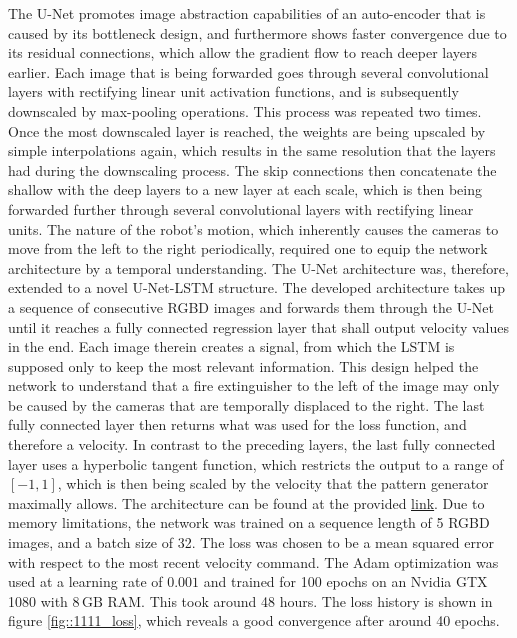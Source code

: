 The U-Net promotes image abstraction capabilities of an auto-encoder that is caused by its bottleneck design, and furthermore shows faster convergence due to its residual connections, which allow the gradient flow to reach deeper layers earlier. Each image that is being forwarded goes through several convolutional layers with rectifying linear unit activation functions, and is subsequently downscaled by max-pooling operations. This process was repeated two times. Once the most downscaled layer is reached, the weights are being upscaled by simple interpolations again, which results in the same resolution that the layers had during the downscaling process. The skip connections then concatenate the shallow with the deep layers to a new layer at each scale, which is then being forwarded further through several convolutional layers with rectifying linear units. The nature of the robot's motion, which inherently causes the cameras to move from the left to the right periodically, required one to equip the network architecture by a temporal understanding. The U-Net architecture was, therefore, extended to a novel U-Net-LSTM structure. The developed architecture takes up a sequence of consecutive RGBD images and forwards them through the U-Net until it reaches a fully connected regression layer that shall output velocity values in the end. Each image therein creates a signal, from which the LSTM is supposed only to keep the most relevant information. This design helped the network to understand that a fire extinguisher to the left of the image may only be caused by the cameras that are temporally displaced to the right. The last fully connected layer then returns what was used for the loss function, and therefore a velocity. In contrast to the preceding layers, the last fully connected layer uses a hyperbolic tangent function, which restricts the output to a range of $[-1,1]$, which is then being scaled by the velocity that the pattern generator maximally allows. The architecture can be found at the provided \href{https://github.com/mhubii/nmpc_pattern_generator/blob/master/libs/learning/python/unet_model.py}{\underline{link}}. Due to memory limitations, the network was trained on a sequence length of 5 RGBD images, and a batch size of 32. The loss was chosen to be a mean squared error with respect to the most recent velocity command. The Adam optimization \cite{kingma2014adam} was used at a learning rate of  $0.001$ and trained for 100 epochs on an Nvidia GTX 1080 with $8\,\text{GB}$ RAM. This took around 48 hours. The loss history is shown in figure \ref{fig::1111_loss}, which reveals a good convergence after around 40 epochs.
